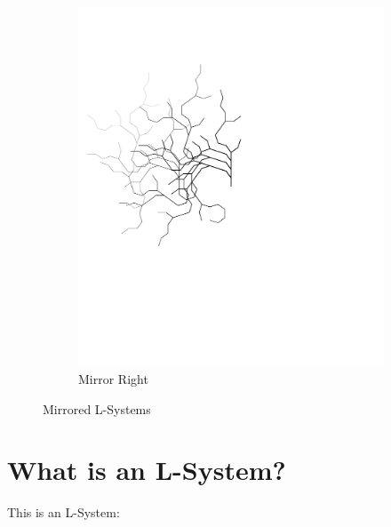 \documentclass[12pt,twoside]{reedthesis}
\begin{document}
\begin{figure}[h]
\begin{subfigure}{0.5\textwidth}
		\includegraphics[clip=true, viewport=0in 3.5in 6in 10in, scale = 0.5]{Images/ThePathWeWillFollow4B}
		\caption[Mirror Right]{Mirror Right\footnotemark}	
		\label {MirrorRight}
	\end{subfigure}
	\caption[Mirrored L-Systems]{Mirrored L-Systems}
	\label{Same}
	\end{figure}
	
	\addtocounter{footnote}{-1}
	\addtocounter{footnote}{1}

	
	
\chapter{What is an L-System?}

This is an L-System:
\end{document}
